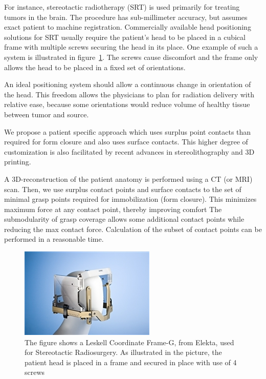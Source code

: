 For instance, stereotactic radiotherapy (SRT) is used primarily for treating 
tumors in the brain. The procedure has sub-millimeter accuracy, but assumes 
exact patient to machine registration. Commercially available head positioning 
solutions for SRT usually require the patient's head to be placed in a cubical 
frame with multiple screws securing the head in its place. One example of such
a system is illustrated in figure~\ref{fig:leskellFrame}. The screws cause discomfort and the frame only allows the head to be placed in a fixed set of orientations.

An ideal positioning system should allow a continuous change in orientation of the head. This freedom allows the physicians to plan for radiation delivery with relative ease, because some orientations would reduce volume of healthy tissue between tumor and source. 


We propose a patient specific approach which uses surplus
point contacts than required for form closure and also uses surface contacts. 
This higher degree of customization is also facilitated by
recent advances in stereolithography and 3D printing.\cite{Lipson2013, gershenfeld2007fab}

A 3D-reconstruction of the patient anatomy is performed using a CT (or MRI) scan. Then, we use surplus contact points and surface contacts to the set of minimal grasp points required for immobilization (form closure). This minimizes maximum force at any contact point, thereby improving comfort The submodularity of grasp coverage allows some additional contact points while reducing the max contact force. Calculation of the subset of contact points can be performed in a reasonable time. 


\begin{figure}[t!]
  \begin{center}
    \includegraphics[width=0.8\linewidth]{images/leskellFrame}
  \end{center}
  \vspace{-10pt}
\caption{ The figure shows a Leskell Coordinate Frame-G, from Elekta, used for Stereotactic Radiosurgery.
As illustrated in the picture, the patient head is placed in a frame and secured in place with 
use of 4 screws}
  \vspace*{-15pt}
  \label{fig:leskellFrame}
\end{figure}


